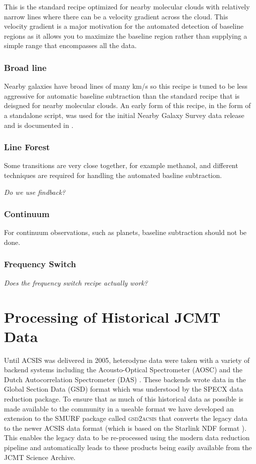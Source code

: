\documentclass[final,authoryear,5p,times,twocolumn]{elsarticle}
\begin{document}
This is the standard recipe optimized for nearby molecular clouds with
relatively narrow lines where there can be a velocity gradient across
the cloud. This velocity gradient is a major motivation for the
automated detection of baseline regions as it allows you to maximize
the baseline region rather than supplying a simple range that
encompasses all the data.

\subsubsection{Broad line}

Nearby galaxies have broad lines of many km/s so this recipe is tuned
to be less aggressive for automatic baseline subtraction than the
standard recipe that is deisgned for nearby molecular clouds. An early
form of this recipe, in the form of a standalone script, was used for
the initial Nearby Galaxy Survey data release and is documented in
\citet{2010ApJ...714..571W}.

\subsubsection{Line Forest}

Some transitions are very close together, for example methanol, and
different techniques are required for handling the automated basline
subtraction.

\textit{Do we use findback?}

\subsubsection{Continuum}

For continuum observations, such as planets, baseline subtraction
should not be done.

\subsubsection{Frequency Switch}

\textit{Does the frequency switch recipe actually work?}

\section{Processing of Historical JCMT Data}

Until ACSIS was delivered in 2005, heterodyne data were taken with a
variety of backend systems including the Acousto-Optical Spectrometer
(AOSC) and the Dutch Autocorrelation Spectrometer (DAS)
\citep{1986SPIE..598..134B}. These backends wrote data in the
Global Section Data (GSD) format \citep[e.g.][]{GSD1999} which was
understood by the SPECX data reduction package. To ensure that as much
of this historical data as possible is made available to the community
in a useable format we have developed an extension to the SMURF
package called \textsc{gsd2acsis} that converts the legacy data to the
newer ACSIS data format (which is based on the Starlink NDF format
\citep{NDF}). This enables the legacy data to be re-processed using
the modern data reduction pipeline and automatically leads to these
products being easily available from the JCMT Science Archive.
\end{document}
